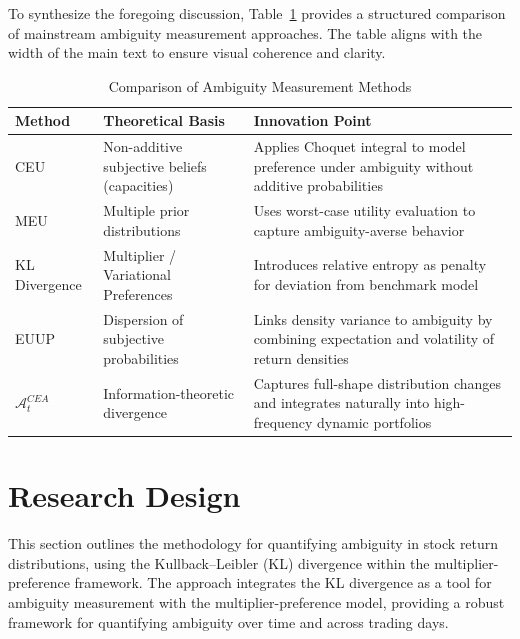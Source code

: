 \documentclass[preprint,12pt,authoryear]{elsarticle}
\begin{document}
To synthesize the foregoing discussion, Table~\ref{tab:ambiguity_methods} provides a structured comparison of mainstream ambiguity measurement approaches. The table aligns with the width of the main text to ensure visual coherence and clarity.
\begin{table}[H]
  \centering
  \caption{Comparison of Ambiguity Measurement Methods}
  \label{tab:ambiguity_methods}
  \renewcommand{\arraystretch}{1.3}
  \begin{tabularx}{\linewidth}{>{\raggedright\arraybackslash}X >{\raggedright\arraybackslash}X p{}}
    \toprule
    \textbf{Method} & \textbf{Theoretical Basis} & \textbf{Innovation Point} \\
    \midrule
    CEU \citep{schmeidler1989} & Non-additive subjective beliefs (capacities) & Applies Choquet integral to model preference under ambiguity without additive probabilities \\
    MEU \citep{gilboa1989} & Multiple prior distributions & Uses worst-case utility evaluation to capture ambiguity-averse behavior \\
    KL Divergence \citep{hansen2001} & Multiplier / Variational Preferences & Introduces relative entropy as penalty for deviation from benchmark model \\
    EUUP \citep{izhakian2020} & Dispersion of subjective probabilities & Links density variance to ambiguity by combining expectation and volatility of return densities \\
    \textbf{$\mathcal{A}^{CEA}_t$} & Information-theoretic divergence & Captures full-shape distribution changes and integrates naturally into high-frequency dynamic portfolios \\
    \bottomrule
  \end{tabularx}
\end{table}


\section{Research Design}
\label{sec:researchdes}

This section outlines the methodology for quantifying ambiguity in stock return distributions, using the Kullback–Leibler (KL) divergence within the multiplier-preference framework. The approach integrates the KL divergence as a tool for ambiguity measurement with the multiplier-preference model, providing a robust framework for quantifying ambiguity over time and across trading days.
\end{document}
